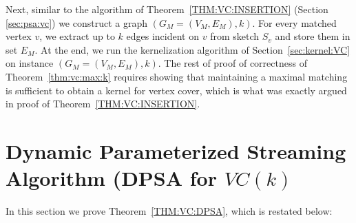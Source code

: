 \documentclass[11pt,letter]{article}
\begin{document}
Next, similar to the algorithm of Theorem~\ref{THM:VC:INSERTION} (Section \ref{sec:psa:vc}) we construct a graph $(G_M=(V_M,E_M),k)$.
For every matched vertex $v$, we extract up to $k$ edges incident on $v$ from
sketch $S_v$ and store them in set $E_M$. At the end,
we run the kernelization algorithm of Section~\ref{sec:kernel:VC}
on instance $(G_M=(V_M,E_M),k)$. The rest of proof of correctness of
Theorem~\ref{thm:vc:max:k} requires showing that maintaining a maximal
matching is sufficient to obtain a kernel for vertex cover, which is what was exactly argued in proof of Theorem~\ref{THM:VC:INSERTION}.






\section{Dynamic Parameterized Streaming Algorithm (DPSA for $VC(k)$ }
\label{app:vc:dpsa}

In this section we prove Theorem~\ref{THM:VC:DPSA}, which is restated below:
\end{document}
